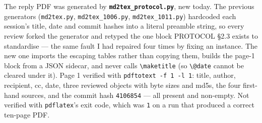 \documentclass[11pt,a4paper]{article}
\begin{document}
The reply PDF was generated by \textbf{\mbox{\texttt{md2tex\_protocol.py}}}, new today. The previous generators (\mbox{\texttt{md2tex.py}}, \mbox{\texttt{md2tex\_1006.py}}, \mbox{\texttt{md2tex\_1011.py}}) hardcoded each session's title, date and commit hashes into a literal preamble string, so every review forked the generator and retyped the one block PROTOCOL \S{}2.3 exists to standardise --- the same fault I had repaired four times by fixing an instance. The new one imports the escaping tables rather than copying them, builds the page-1 block from a JSON sidecar, and never calls \mbox{\texttt{\textbackslash{}maketitle}} (so \mbox{\texttt{\textbackslash{}@date}} cannot be cleared under it). Page 1 verified with \mbox{\texttt{pdftotext -f 1 -l 1}}: title, author, recipient, cc, date, three reviewed objects with byte sizes and md5s, the four first-hand sources, and the commit hash \mbox{\texttt{4106854}} --- all present and non-empty. Not verified with \mbox{\texttt{pdflatex}}'s exit code, which was \mbox{\texttt{1}} on a run that produced a correct ten-page PDF.
\end{document}

